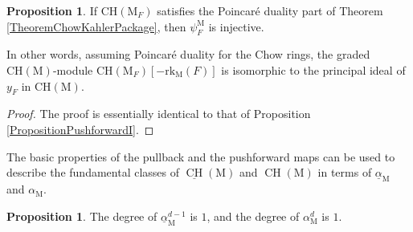 \documentclass[11pt,reqno]{amsart}
\theoremstyle{definition}
\newtheorem{proposition}[theorem]{Proposition}
\theoremstyle{remark}
\renewcommand{\(}{\left(}
\renewcommand{\)}{\right)}
\newcommand{\<}{\left<}
\renewcommand{\>}{\right>}
\newcommand{\CH}{\operatorname{CH}}
\begin{document}


\begin{proposition}\label{psi-injective}
If  $\mathrm{CH}(\mathrm{M}_F)$ satisfies the Poincar\'e duality part of Theorem \ref{TheoremChowKahlerPackage},
then $\psi_F^\mathrm{M}$ is injective.
\end{proposition}

In other words, assuming Poincar\'e duality for the Chow rings,
 the graded $\mathrm{CH}(\mathrm{M})$-module $ \mathrm{CH}(\mathrm{M}_F) [-\text{rk}_\mathrm{M}(F)]$ 
is isomorphic to  the principal ideal of $y_F$ in $\mathrm{CH}(\mathrm{M})$.


\begin{proof}
The proof is essentially identical to that of Proposition \ref{PropositionPushforwardI}.
\end{proof}

The basic properties of the pullback and the pushforward maps can be used to describe the fundamental classes
of $\underline{\CH}(\mathrm{M})$ and $\CH(\mathrm{M})$ in terms of $\underline{\alpha}_\mathrm{M}$ and $\alpha_\mathrm{M}$.

\begin{proposition}\label{PropositionAlphaDegree}
The degree of $\underline{\alpha}^{d-1}_\mathrm{M}$ is $1$, and the degree of $\alpha^d_\mathrm{M}$ is $1$.
\end{proposition}
\end{document}
